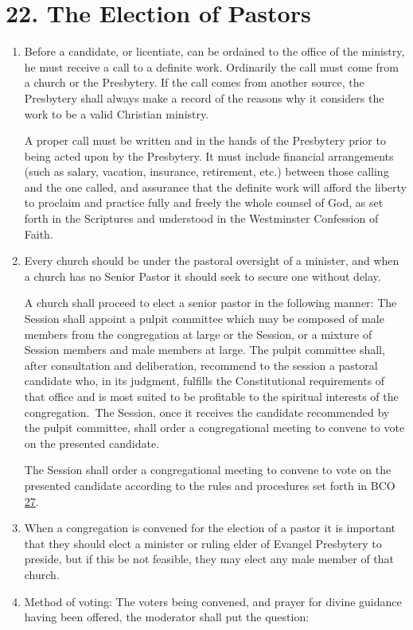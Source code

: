 \documentclass[
]{book}
\begin{document}
\hypertarget{the-election-of-pastors}{%
\section*{22. The Election of Pastors}\label{the-election-of-pastors}}

\protect\hypertarget{chapter-slug-22-the-election-of-pastors}{\href{}{}}

\begin{enumerate}
\def\labelenumi{\arabic{enumi}.}
\item
  \protect\hypertarget{22}{\href{}{}}\protect\hypertarget{22.1}{\href{}{}}Before a candidate, or licentiate, can be ordained to the office of the ministry, he must receive a call to a definite work. Ordinarily the call must come from a church or the Presbytery. If the call comes from another source, the Presbytery shall always make a record of the reasons why it considers the work to be a valid Christian ministry.

  A proper call must be written and in the hands of the Presbytery prior to being acted upon by the Presbytery. It must include financial arrangements (such as salary, vacation, insurance, retirement, etc.) between those calling and the one called, and assurance that the definite work will afford the liberty to proclaim and practice fully and freely the whole counsel of God, as set forth in the Scriptures and understood in the Westminster Confession of Faith.
\item
  Every church should be under the pastoral oversight of a minister, and when a church has no Senior Pastor it should seek to secure one without delay.

  A church shall proceed to elect a senior pastor in the following manner: The Session shall appoint a pulpit committee which may be composed of male members from the congregation at large or the Session, or a mixture of Session members and male members at large. The pulpit committee shall, after consultation and deliberation, recommend to the session a pastoral candidate who, in its judgment, fulfills the Constitutional requirements of that office and is most suited to be profitable to the spiritual interests of the congregation.~The Session, once it receives the candidate recommended by the pulpit committee, shall order a congregational meeting to convene to vote on the presented candidate.

  The Session shall order a congregational meeting to convene to vote on the presented candidate according to the rules and procedures set forth in BCO \protect\hyperlink{27}{27}.
\item
  When a congregation is convened for the election of a pastor it is important that they should elect a minister or ruling elder of Evangel Presbytery to preside, but if this be not feasible, they may elect any male member of that church.
\item
  Method of voting: The voters being convened, and prayer for divine guidance having been offered, the moderator shall put the question:


\end{enumerate}
\end{document}
